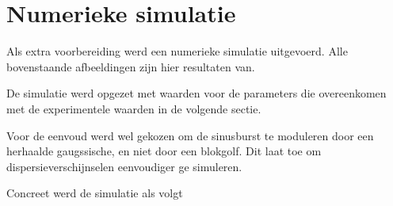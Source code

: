 \section{Numerieke simulatie}
Als extra voorbereiding werd een numerieke simulatie uitgevoerd. Alle 
bovenstaande afbeeldingen zijn hier resultaten van.

De simulatie werd opgezet met waarden voor de parameters die overeenkomen 
met de experimentele waarden in de volgende sectie.

Voor de eenvoud werd wel gekozen om de sinusburst te moduleren door een 
herhaalde gaugssische, en niet door een blokgolf. Dit laat toe om 
dispersieverschijnselen eenvoudiger ge simuleren.

Concreet werd de simulatie als volgt
